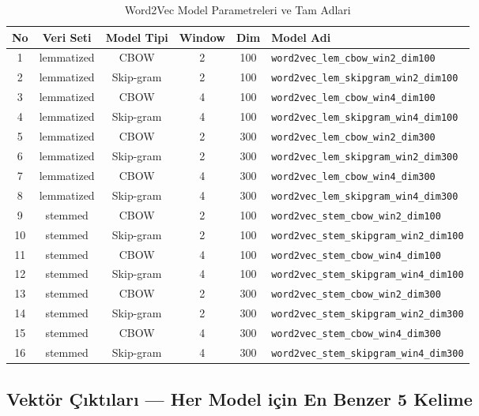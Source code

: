 \documentclass[12pt, a4paper]{article}
\begin{document}
\begin{table}[H]
\centering
\caption{Word2Vec Model Parametreleri ve Tam Adlari}
\begin{tabular}{cccccl}
\toprule
\textbf{No} & \textbf{Veri Seti} & \textbf{Model Tipi} & \textbf{Window} & \textbf{Dim} & \textbf{Model Adi} \\
\midrule
1  & lemmatized & CBOW      & 2 & 100 & \texttt{word2vec\_lem\_cbow\_win2\_dim100} \\
2  & lemmatized & Skip-gram & 2 & 100 & \texttt{word2vec\_lem\_skipgram\_win2\_dim100} \\
3  & lemmatized & CBOW      & 4 & 100 & \texttt{word2vec\_lem\_cbow\_win4\_dim100} \\
4  & lemmatized & Skip-gram & 4 & 100 & \texttt{word2vec\_lem\_skipgram\_win4\_dim100} \\
5  & lemmatized & CBOW      & 2 & 300 & \texttt{word2vec\_lem\_cbow\_win2\_dim300} \\
6  & lemmatized & Skip-gram & 2 & 300 & \texttt{word2vec\_lem\_skipgram\_win2\_dim300} \\
7  & lemmatized & CBOW      & 4 & 300 & \texttt{word2vec\_lem\_cbow\_win4\_dim300} \\
8  & lemmatized & Skip-gram & 4 & 300 & \texttt{word2vec\_lem\_skipgram\_win4\_dim300} \\
9  & stemmed    & CBOW      & 2 & 100 & \texttt{word2vec\_stem\_cbow\_win2\_dim100} \\
10 & stemmed    & Skip-gram & 2 & 100 & \texttt{word2vec\_stem\_skipgram\_win2\_dim100} \\
11 & stemmed    & CBOW      & 4 & 100 & \texttt{word2vec\_stem\_cbow\_win4\_dim100} \\
12 & stemmed    & Skip-gram & 4 & 100 & \texttt{word2vec\_stem\_skipgram\_win4\_dim100} \\
13 & stemmed    & CBOW      & 2 & 300 & \texttt{word2vec\_stem\_cbow\_win2\_dim300} \\
14 & stemmed    & Skip-gram & 2 & 300 & \texttt{word2vec\_stem\_skipgram\_win2\_dim300} \\
15 & stemmed    & CBOW      & 4 & 300 & \texttt{word2vec\_stem\_cbow\_win4\_dim300} \\
16 & stemmed    & Skip-gram & 4 & 300 & \texttt{word2vec\_stem\_skipgram\_win4\_dim300} \\
\bottomrule
\end{tabular}
\end{table}

\subsection{Vektör Çıktıları — Her Model için En Benzer 5 Kelime}
\end{document}
